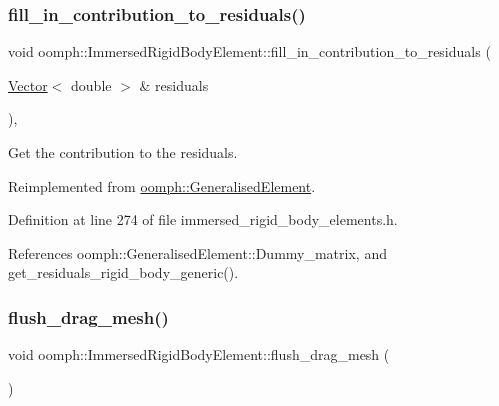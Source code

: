 \mbox{\label{classoomph_1_1ImmersedRigidBodyElement_abeff18198ffb78f6eb4bfe90c5f0b846}} 
\subsubsection{\texorpdfstring{fill\+\_\+in\+\_\+contribution\+\_\+to\+\_\+residuals()}{fill\_in\_contribution\_to\_residuals()}}
{\footnotesize\ttfamily void oomph\+::\+Immersed\+Rigid\+Body\+Element\+::fill\+\_\+in\+\_\+contribution\+\_\+to\+\_\+residuals (\begin{DoxyParamCaption}\item[{\hyperlink{classoomph_1_1Vector}{Vector}$<$ double $>$ \&}]{residuals }\end{DoxyParamCaption})\hspace{0.3cm}{\ttfamily [inline]}, {\ttfamily [virtual]}}



Get the contribution to the residuals. 



Reimplemented from \hyperlink{classoomph_1_1GeneralisedElement_a310c97f515e8504a48179c0e72c550d7}{oomph\+::\+Generalised\+Element}.



Definition at line 274 of file immersed\+\_\+rigid\+\_\+body\+\_\+elements.\+h.



References oomph\+::\+Generalised\+Element\+::\+Dummy\+\_\+matrix, and get\+\_\+residuals\+\_\+rigid\+\_\+body\+\_\+generic().

\mbox{\label{classoomph_1_1ImmersedRigidBodyElement_a2ee0f157b7a4f1b7ad89b3d45a4cf620}} 
\subsubsection{\texorpdfstring{flush\+\_\+drag\+\_\+mesh()}{flush\_drag\_mesh()}}
{\footnotesize\ttfamily void oomph\+::\+Immersed\+Rigid\+Body\+Element\+::flush\+\_\+drag\+\_\+mesh (\begin{DoxyParamCaption}{ }\end{DoxyParamCaption})\hspace{0.3cm}{\ttfamily [inline]}}



